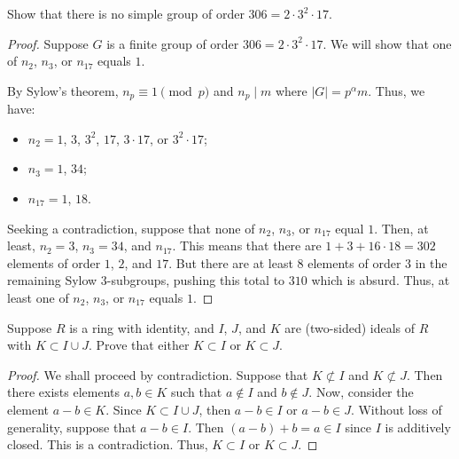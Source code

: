\begin{problem}
Show that there is no simple group of order $306=2\cdot 3^2\cdot 17$.
\end{problem}
\begin{proof}
Suppose $G$ is a finite group of order $306=2\cdot 3^2\cdot 17$. We will
show that one of $n_2$, $n_3$, or $n_{17}$ equals $1$.

By Sylow's theorem, $n_p\equiv 1\pmod{p}$ and $n_p\mid m$ where
$|G|=p^\alpha m$. Thus, we have:
\begin{itemize}[noitemsep]
\item $n_2=1$, $3$, $3^2$, $17$, $3\cdot 17$, or $3^2\cdot 17$;
\item $n_3=1$, $34$;
\item $n_{17}=1$, $18$.
\end{itemize}
Seeking a contradiction, suppose that none of $n_2$, $n_3$, or $n_{17}$
equal $1$. Then, at least, $n_2=3$, $n_3=34$, and $n_{17}$. This means that
there are $1+3+16\cdot 18=302$ elements of order $1$, $2$, and $17$. But
there are at least $8$ elements of order $3$ in the remaining Sylow
$3$-subgroups, pushing this total to $310$ which is absurd. Thus, at least
one of $n_2$, $n_3$, or $n_{17}$ equals $1$.
\end{proof}

\begin{problem}
Suppose $R$ is a ring with identity, and $I$, $J$, and $K$ are (two-sided)
ideals of $R$ with $K\subset I\cup J$. Prove that either $K\subset I$ or
$K\subset J$.
\end{problem}
\begin{proof}
We shall proceed by contradiction. Suppose that $K\nsubset I$ and
$K\nsubset J$. Then there exists elements $a,b\in K$ such that $a\notin I$
and $b\notin J$. Now, consider the element $a-b\in K$. Since $K\subset
I\cup J$, then $a-b\in I$ or $a-b\in J$. Without loss of generality,
suppose that $a-b\in I$. Then $(a-b)+b=a\in I$ since $I$ is additively
closed. This is a contradiction. Thus, $K\subset I$ or $K\subset J$.
\end{proof}

